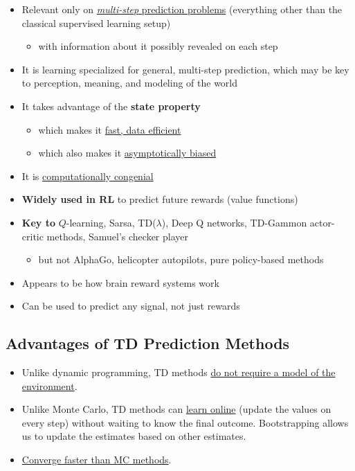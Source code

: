 \documentclass[12pt, a4paper]{article}
\begin{document}
\begin{itemize}
  \item Relevant only on \uline{\textit{multi-step} prediction problems} (everything other than the classical supervised learning setup)
  \begin{itemize}
    \item with information about it possibly revealed on each step
  \end{itemize}
  \item It is learning specialized for general, multi-step prediction, which may be key to perception, meaning, and modeling of the world
  \item It takes advantage of the \textbf{state property}
  \begin{itemize}
    \item which makes it \uline{fast, data efficient}
    \item which also makes it \uline{asymptotically biased}
  \end{itemize}
  \item It is \uline{computationally congenial}
  \item \textbf{Widely used in RL} to predict future rewards (value functions)
  \item \textbf{Key to} $Q$-learning, Sarsa, TD($\lambda$), Deep Q networks, TD-Gammon actor-critic methods, Samuel's checker player
  \begin{itemize}
    \item but not AlphaGo, helicopter autopilots, pure policy-based methods
  \end{itemize}
  \item Appears to be how brain reward systems work
  \item Can be used to predict any signal, not just rewards
\end{itemize}











\subsection{Advantages of TD Prediction Methods}\label{advantages-of-td-prediction-methods}


\begin{itemize}
  \item Unlike dynamic programming, TD methods \uline{do not require a model of the environment}.
  \item Unlike Monte Carlo, TD methods can \uline{learn online} (update the values on every step) without waiting to know the final outcome. Bootstrapping allows us to update the estimates based on other estimates.
  \item \uline{Converge faster than MC methods}.
\end{itemize}
\end{document}
